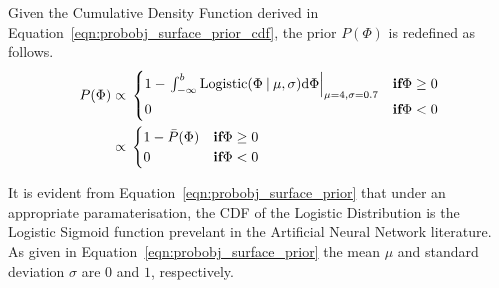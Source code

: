 Given the Cumulative Density Function derived in Equation~\ref{eqn:probobj_surface_prior_cdf}, 
the prior \( P(\Phi) \) is redefined as follows.
\begin{align}
  \label{eqn:probobj_surface_prior}
  P(\Phi) \propto{}& 
  \begin{cases}
    1 - \left. 
    \int_{-\infty}^{b} \text{Logistic}(\Phi \:\vert\: \mu, \sigma) {\mathrm d{\Phi}}
    \right\rvert_{\mu = 4, \sigma = 0.7} & \textbf{if} \Phi \geq 0\\
    0 & \textbf{if} \Phi < 0
  \end{cases}\\
  \propto{}&
  \begin{cases}
    1 - \bar{P}(\Phi) & \textbf{if} \Phi \geq 0\\
    0 & \textbf{if} \Phi < 0
  \end{cases}
\end{align}

It is evident from Equation~\ref{eqn:probobj_surface_prior} that under an 
appropriate paramaterisation, the CDF of the Logistic Distribution is the 
Logistic Sigmoid function prevelant in the Artificial Neural Network literature. 
As given in Equation~\ref{eqn:probobj_surface_prior} the mean \( \mu \) and standard 
deviation \( \sigma \) are \(0\) and \(1\), respectively.


